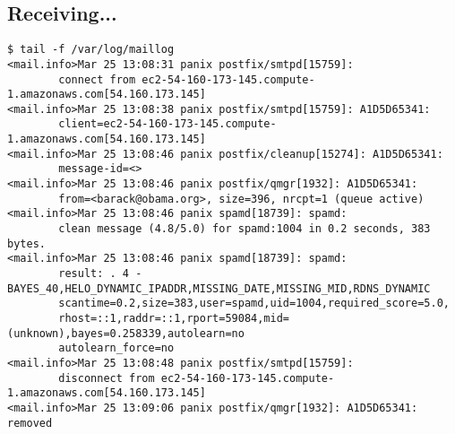 \documentclass[xga]{xdvislides}
\begin{document}
\subsection{Receiving...}
\smallish
\begin{verbatim}
$ tail -f /var/log/maillog
<mail.info>Mar 25 13:08:31 panix postfix/smtpd[15759]:
        connect from ec2-54-160-173-145.compute-1.amazonaws.com[54.160.173.145] 
<mail.info>Mar 25 13:08:38 panix postfix/smtpd[15759]: A1D5D65341:
        client=ec2-54-160-173-145.compute-1.amazonaws.com[54.160.173.145]
<mail.info>Mar 25 13:08:46 panix postfix/cleanup[15274]: A1D5D65341:
        message-id=<>
<mail.info>Mar 25 13:08:46 panix postfix/qmgr[1932]: A1D5D65341:
        from=<barack@obama.org>, size=396, nrcpt=1 (queue active)
<mail.info>Mar 25 13:08:46 panix spamd[18739]: spamd:
        clean message (4.8/5.0) for spamd:1004 in 0.2 seconds, 383 bytes.
<mail.info>Mar 25 13:08:46 panix spamd[18739]: spamd:
        result: . 4 - BAYES_40,HELO_DYNAMIC_IPADDR,MISSING_DATE,MISSING_MID,RDNS_DYNAMIC
        scantime=0.2,size=383,user=spamd,uid=1004,required_score=5.0,
        rhost=::1,raddr=::1,rport=59084,mid=(unknown),bayes=0.258339,autolearn=no
        autolearn_force=no
<mail.info>Mar 25 13:08:48 panix postfix/smtpd[15759]:
        disconnect from ec2-54-160-173-145.compute-1.amazonaws.com[54.160.173.145]
<mail.info>Mar 25 13:09:06 panix postfix/qmgr[1932]: A1D5D65341: removed
\end{verbatim}
\Normalsize
\end{document}
